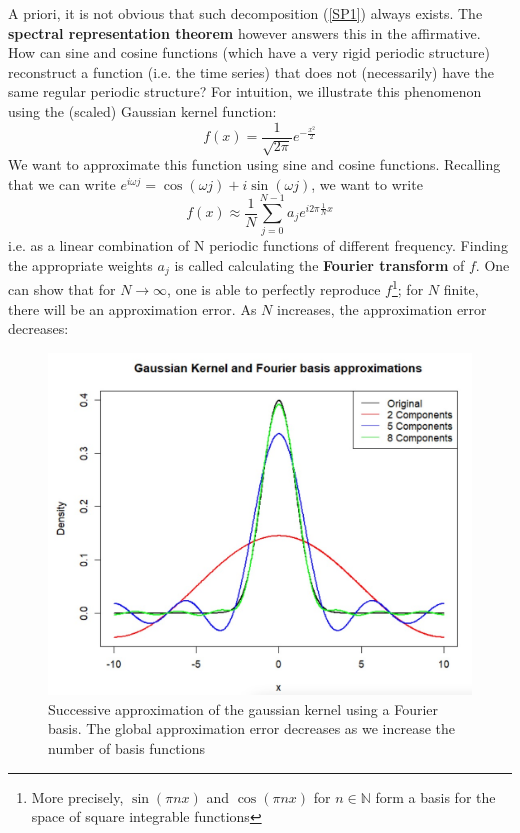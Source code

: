 A priori, it is not obvious that such decomposition (\ref{SP1}) always exists. The \textbf{spectral representation theorem} however answers this in the affirmative. How can sine and cosine functions (which have a very rigid periodic structure) reconstruct a function (i.e. the time series) that does not (necessarily) have the same regular periodic structure? For intuition, we illustrate this phenomenon using the (scaled) Gaussian kernel function: \[f(x)=\frac{1}{\sqrt{2\pi}}e^{-\frac{x^2}{2}} \]
We want to approximate this function using sine and cosine functions. Recalling that we can write $e^{i\omega j} = \cos(\omega j) + i \sin(\omega j)$, we want to write \[f(x) \approx \frac{1}{N} \sum_{j=0}^{N-1}a_j e^{i2\pi\frac{1}{N} x} \] i.e. as a linear combination of N periodic functions of different frequency. Finding the appropriate weights $a_j$ is called calculating the \textbf{Fourier transform} of $f$. One can show that for $N\rightarrow\infty$, one is able to perfectly reproduce $f$\footnote{More precisely, $\sin(\pi n x)$ and $\cos(\pi nx)$ for $n \in \mathbb{N}$ form a basis for the space of square integrable functions}; for $N$ finite, there will be an approximation error. As $N$ increases, the approximation error decreases: 

\begin{figure}[H]
\includegraphics[scale=0.3]{images/Screenshot 2024-05-06 at 09.35.47.jpg}
\centering
\caption{Successive approximation of the gaussian kernel using a Fourier basis. The global approximation error decreases as we increase the number of basis functions}
\end{figure}

